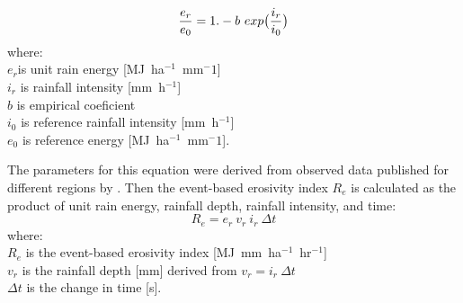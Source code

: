 \documentclass[gmd, manuscript]{copernicus}
\begin{document}
\begin{equation}
\label{eq:rain_energy}
{e_r \over e_0} = 1.- b ~ exp\bigl({i_r \over i_0} \bigr)
\end{equation}
%
{\small
\noindent
where: \\
\noindent
\hspace*{0.5em} $e_r$is unit rain energy [\unit{MJ~ha}$^{-1}$~\unit{mm}${^-1}$]\\
\hspace*{0.5em} $i_r$ is rainfall intensity [\unit{mm~h}$^{-1}$]\\
\hspace*{0.5em} $b$ is empirical coeficient\\
\hspace*{0.5em} $i_0$ is reference rainfall intensity [\unit{mm~h}$^{-1}$]\\
\hspace*{0.5em} $e_0$ is reference energy [\unit{MJ~ha}$^{-1}$~\unit{mm}${^-1}$]. 
}

\noindent
The parameters for this equation were derived from observed data
published for different regions by \cite{Panagos2017}.
\noindent
Then the event-based erosivity index $R_e$ 
is calculated as the product of 
unit rain energy, rainfall depth, rainfall intensity, and time: 
\begin{equation}
\label{eq:erosivity_index}
{R_e = e_r ~ v_r ~ i_r ~ \Delta t}
\end{equation}
%
{\small
\noindent
where: \\
\hspace*{0.5em} $R_e$ is the event-based erosivity index [\unit{MJ~mm~ha}$^{-1}$~\unit{hr}$^{-1}$]\\
\hspace*{0.5em} $v_r$ is the rainfall depth [\unit{mm}] derived from ${v_r = i_r~\Delta t}$\\
\hspace*{0.5em} $\Delta t$ is the change in time [\unit{s}].
}


\end{document}
